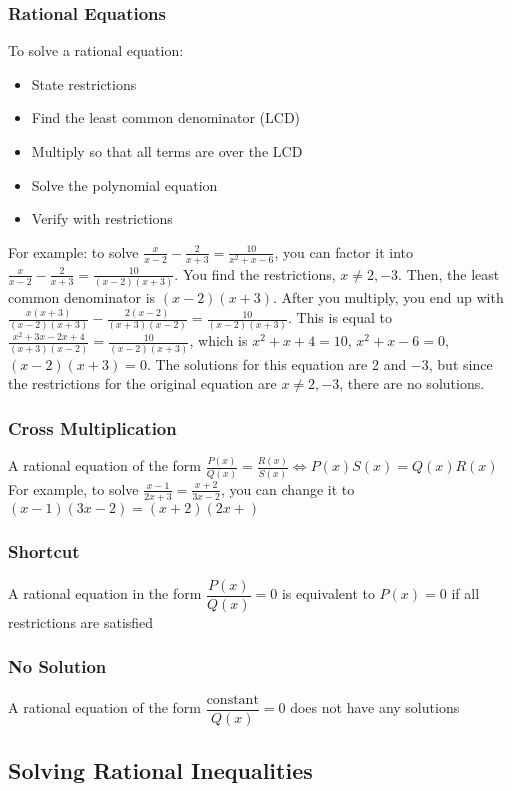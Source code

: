 \documentclass{article}
\begin{document}
	\subsubsection{Rational Equations}
	To solve a rational equation:
	\begin{itemize}
		\item State restrictions
		\item Find the least common denominator (LCD)
		\item Multiply so that all terms are over the LCD
		\item Solve the polynomial equation
		\item Verify with restrictions
	\end{itemize}
	For example: to solve $\frac{x}{x-2}-\frac{2}{x+3}=\frac{10}{x^2+x-6}$, you can factor it into $\frac{x}{x-2}-\frac{2}{x+3}=\frac{10}{(x-2)(x+3)}$. You find the restrictions, $x\neq2,-3$. Then, the least common denominator is $(x-2)(x+3)$. After you multiply, you end up with $\frac{x(x+3)}{(x-2)(x+3)}-\frac{2(x-2)}{(x+3)(x-2)}=\frac{10}{(x-2)(x+3)}$. This is equal to $\frac{x^2+3x-2x+4}{(x+3)(x-2)}=\frac{10}{(x-2)(x+3)}$, which is $x^2+x+4=10$, $x^2+x-6=0$, $(x-2)(x+3)=0$. The solutions for this equation are 2 and $-3$, but since the restrictions for the original equation are $x\neq2,-3$, there are no solutions.
	\subsubsection{Cross Multiplication}
	A rational equation of the form $\frac{P(x)}{Q(x)}=\frac{R(x)}{S(x)}\Leftrightarrow P(x)S(x)=Q(x)R(x)$\\
	For example, to solve $\frac{x-1}{2x+3}=\frac{x+2}{3x-2}$, you can change it to $(x-1)(3x-2)=(x+2)(2x+)$
	\subsubsection{Shortcut}
	A rational equation in the form $\dfrac{P(x)}{Q(x)}=0$ is equivalent to $P(x)=0$ if all restrictions are satisfied
	\subsubsection{No Solution}
	A rational equation of the form $\dfrac{\text{constant}}{Q(x)}=0$ does not have any solutions
	\subsection{Solving Rational Inequalities}
\end{document}
